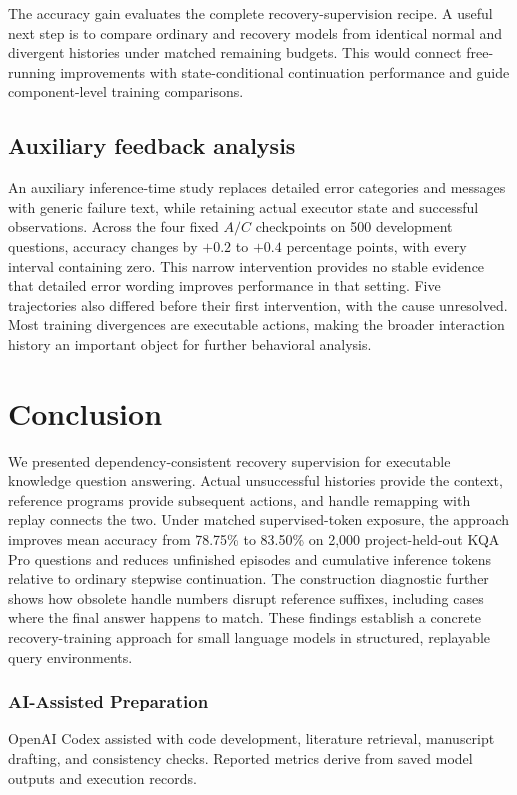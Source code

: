 \documentclass[runningheads]{llncs}
\begin{document}
The accuracy gain evaluates the complete recovery-supervision recipe. A useful next step is to compare ordinary and recovery models from identical normal and divergent histories under matched remaining budgets. This would connect free-running improvements with state-conditional continuation performance and guide component-level training comparisons.

\subsection{Auxiliary feedback analysis}

An auxiliary inference-time study replaces detailed error categories and messages with generic failure text, while retaining actual executor state and successful observations. Across the four fixed $A/C$ checkpoints on 500 development questions, accuracy changes by $+0.2$ to $+0.4$ percentage points, with every interval containing zero. This narrow intervention provides no stable evidence that detailed error wording improves performance in that setting. Five trajectories also differed before their first intervention, with the cause unresolved. Most training divergences are executable actions, making the broader interaction history an important object for further behavioral analysis.

\section{Conclusion}

We presented dependency-consistent recovery supervision for executable knowledge question answering. Actual unsuccessful histories provide the context, reference programs provide subsequent actions, and handle remapping with replay connects the two. Under matched supervised-token exposure, the approach improves mean accuracy from 78.75\% to 83.50\% on 2,000 project-held-out KQA Pro questions and reduces unfinished episodes and cumulative inference tokens relative to ordinary stepwise continuation. The construction diagnostic further shows how obsolete handle numbers disrupt reference suffixes, including cases where the final answer happens to match. These findings establish a concrete recovery-training approach for small language models in structured, replayable query environments.


\subsubsection*{AI-Assisted Preparation}
OpenAI Codex assisted with code development, literature retrieval, manuscript drafting, and consistency checks. Reported metrics derive from saved model outputs and execution records.



\end{document}
